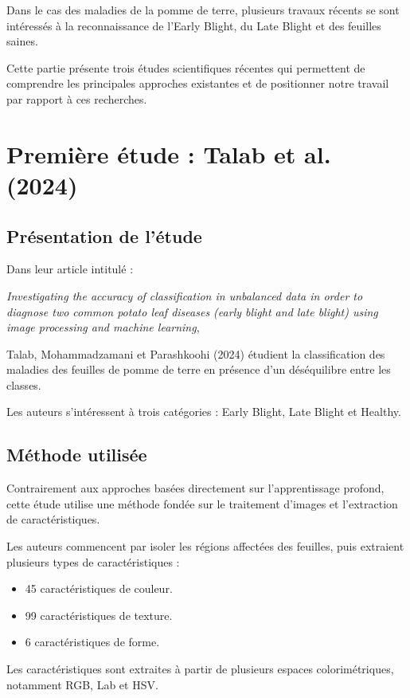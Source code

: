 \documentclass[12pt,a4paper,oneside]{report}
\begin{document}
Dans le cas des maladies de la pomme de terre, plusieurs
travaux récents se sont intéressés à la reconnaissance
de l'Early Blight, du Late Blight et des feuilles saines.

Cette partie présente trois études scientifiques récentes
qui permettent de comprendre les principales approches
existantes et de positionner notre travail par rapport
à ces recherches.

\section{Première étude : Talab et al. (2024)}

\subsection{Présentation de l'étude}

Dans leur article intitulé :

\textit{Investigating the accuracy of classification in
unbalanced data in order to diagnose two common potato
leaf diseases (early blight and late blight) using image
processing and machine learning},

Talab, Mohammadzamani et Parashkoohi (2024) étudient
la classification des maladies des feuilles de pomme
de terre en présence d'un déséquilibre entre les classes.

Les auteurs s'intéressent à trois catégories :
Early Blight, Late Blight et Healthy.

\subsection{Méthode utilisée}

Contrairement aux approches basées directement sur
l'apprentissage profond, cette étude utilise une méthode
fondée sur le traitement d'images et l'extraction
de caractéristiques.

Les auteurs commencent par isoler les régions affectées
des feuilles, puis extraient plusieurs types de caractéristiques :

\begin{itemize}
    \item 45 caractéristiques de couleur.
    \item 99 caractéristiques de texture.
    \item 6 caractéristiques de forme.
\end{itemize}

Les caractéristiques sont extraites à partir de plusieurs
espaces colorimétriques, notamment RGB, Lab et HSV.
\end{document}
